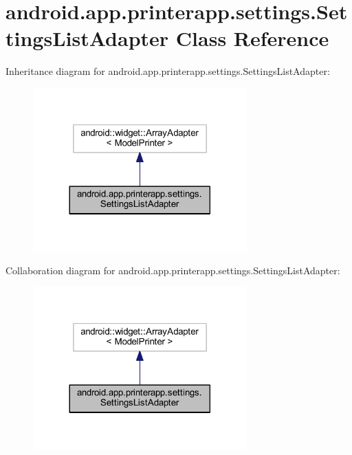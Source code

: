 \hypertarget{classandroid_1_1app_1_1printerapp_1_1settings_1_1_settings_list_adapter}{}\section{android.\+app.\+printerapp.\+settings.\+Settings\+List\+Adapter Class Reference}
\label{classandroid_1_1app_1_1printerapp_1_1settings_1_1_settings_list_adapter}


Inheritance diagram for android.\+app.\+printerapp.\+settings.\+Settings\+List\+Adapter\+:
\nopagebreak
\begin{figure}[H]
\begin{center}
\leavevmode
\includegraphics[width=233pt]{classandroid_1_1app_1_1printerapp_1_1settings_1_1_settings_list_adapter__inherit__graph}
\end{center}
\end{figure}


Collaboration diagram for android.\+app.\+printerapp.\+settings.\+Settings\+List\+Adapter\+:
\nopagebreak
\begin{figure}[H]
\begin{center}
\leavevmode
\includegraphics[width=233pt]{classandroid_1_1app_1_1printerapp_1_1settings_1_1_settings_list_adapter__coll__graph}
\end{center}
\end{figure}
